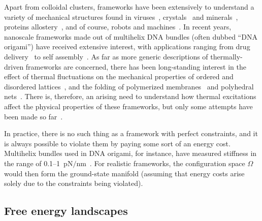 Apart from colloidal clusters, frameworks have been extensively to understand a variety of mechanical structures found in viruses~\cite{hespenheide2004},
crystals~\cite{power2014} and minerals~\cite{kapko2011},
proteins allostery~\cite{gaspar2012}, and of course,
robots and machines~\cite{farber2008,donelan2007}.
In recent years, nanoscale frameworks made out of multihelix DNA bundles (often dubbed ``DNA origami'') have received extensive interest, with applications ranging from drug delivery~\cite{zhao2019} to self assembly~\cite{liedl2010}.
As far as more generic descriptions of thermally-driven frameworks are concerned, there has been long-standing interest in the effect of thermal fluctuations on the mechanical properties of ordered and disordered lattices~\cite{zhang2016,woodhouse2018,yan2018}, and the folding of polymerized membranes~\cite{di-francesco2000,nelson2004} and polyhedral nets~\cite{shenoy2012,dodd2018,melo2020}.
There is, therefore, an arising need to understand how thermal excitations affect the physical properties of these frameworks, but only some attempts have been made so far~\cite{kallus2017,rocklin2018}.

In practice, there is no such thing as a framework with perfect constraints, and it is always possible to violate them by paying some sort of an energy cost.
Multihelix bundles used in DNA origami, for instance, have measured stiffness in the range of 0.1--1~pN$/$nm~\cite{jung2020}.
For realistic frameworks, the configuration space $\Omega$ would then form the ground-state manifold (assuming that energy costs arise solely due to the constraints being violated).

\subsection{Free energy landscapes}

